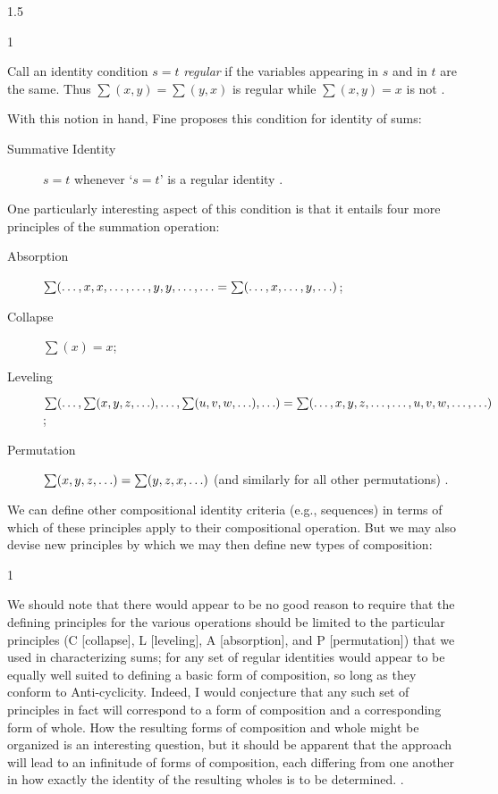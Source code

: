 \documentclass[11pt]{article}
\newenvironment{squote}{%
\begin{spacing}{1}
\begin{list}{}{%
\setlength{\labelwidth}{0pt}%
\rightmargin\leftmargin%
}
\item\relax
}{%
\end{list}%
\end{spacing}
}
\begin{document}
\begin{spacing}{1.5}
\begin{squote}
Call an identity condition $s = t$ {\em regular} if the variables
appearing in $s$ and in $t$ are the same.  Thus $\sum (x, y) = \sum
(y, x)$ is regular while $\sum (x, y) = x$ is not
\citeyearpar[572]{fine2010}.
\end{squote}

With this notion in hand, Fine proposes this condition for identity of
sums:

\begin{description}
  \item[Summative Identity] $s = t$ whenever `$s = t$' is a regular
    identity \citeyearpar[572]{fine2010}.
\end{description}

One particularly interesting aspect of this condition is that it
entails four more principles of the summation operation:

\begin{description}
  \item[Absorption] $\sum (\mathellipsis, x, x, \mathellipsis,
    \mathellipsis, y, y, \mathellipsis, \mathellipsis = \sum (
    \mathellipsis, x, \mathellipsis, y, \mathellipsis )$;
\item[Collapse] $\sum (x) = x$;
\item[Leveling] $\sum (\mathellipsis, \sum (x, y, z, \mathellipsis ),
  \mathellipsis, \sum (u, v, w, \mathellipsis ), \mathellipsis ) \\ =
  \sum (\mathellipsis, x, y, z, \mathellipsis, \mathellipsis, u, v, w,
  \mathellipsis, \mathellipsis )$;
\item[Permutation] $\sum (x, y, z, \mathellipsis ) = \sum (y, z, x,
  \mathellipsis )$ (and similarly for all other permutations)
  \citep[573]{fine2010}.
\end{description}

We can define other compositional identity criteria (e.g., sequences)
in terms of which of these principles apply to their compositional
operation.  But we may also devise new principles by which we may then
define new types of composition:

\begin{squote}
We should note that there would appear to be no good reason to require
that the defining principles for the various operations should be
limited to the particular principles (C [collapse], L [leveling], A
[absorption], and P [permutation]) that we used in characterizing
sums; for any set of regular identities would appear to be equally
well suited to defining a basic form of composition, so long as they
conform to Anti-cyclicity.  Indeed, I would conjecture that any such
set of principles in fact will correspond to a form of composition and
a corresponding form of whole.  How the resulting forms of composition
and whole might be organized is an interesting question, but it should
be apparent that the approach will lead to an infinitude of forms of
composition, each differing from one another in how exactly the
identity of the resulting wholes is to be
determined. \citep[575--576]{fine2010}.
\end{squote}


\end{spacing}
\end{document}
